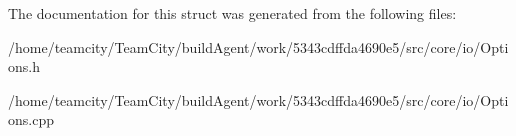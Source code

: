 The documentation for this struct was generated from the following files\+:\begin{DoxyCompactItemize}
\item 
/home/teamcity/\+Team\+City/build\+Agent/work/5343cdffda4690e5/src/core/io/Options.\+h\item 
/home/teamcity/\+Team\+City/build\+Agent/work/5343cdffda4690e5/src/core/io/Options.\+cpp\end{DoxyCompactItemize}
